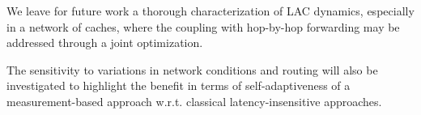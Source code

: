 \documentclass[conference]{IEEEtran}
\begin{document}
We leave for future work a thorough characterization of LAC dynamics, especially in a network of caches, where the coupling with hop-by-hop forwarding may be addressed through a joint optimization. 

The sensitivity to variations in network conditions and routing will also be investigated to highlight the benefit in terms of self-adaptiveness of a measurement-based approach w.r.t. classical latency-insensitive approaches.




\end{document}
